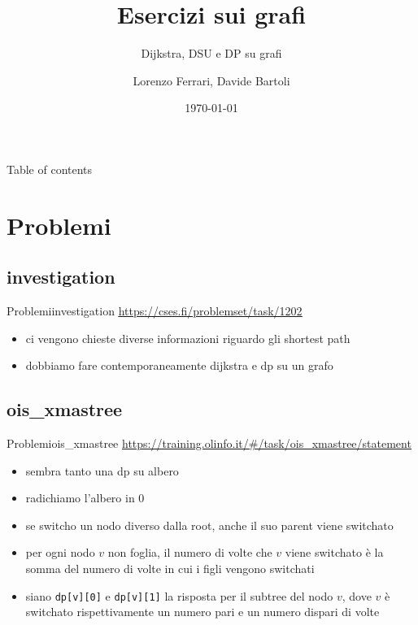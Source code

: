 \documentclass[compress]{beamer}
\title{Esercizi sui grafi}
\subtitle{Dijkstra, DSU e DP su grafi}
\author{Lorenzo Ferrari, Davide Bartoli}
\date{\today}
\begin{document}
\begin{frame}
  \maketitle
\end{frame}

\begin{frame}{Table of contents}
  \tableofcontents
\end{frame}

\section{Problemi}

\subsection{investigation}
\begin{frame}{Problemi}{investigation}
    \underline{\url{https://cses.fi/problemset/task/1202}}
    \begin{itemize}
        \item ci vengono chieste diverse informazioni riguardo gli shortest path
        \pause
    \item dobbiamo fare contemporaneamente dijkstra e dp su un grafo
    \end{itemize}
\end{frame}

\subsection{ois\_xmastree}
\begin{frame}{Problemi}{ois\_xmastree}
    \underline{\url{https://training.olinfo.it/\#/task/ois_xmastree/statement}}
    \begin{itemize}
        \item sembra tanto una dp su albero
        \pause
        \item radichiamo l'albero in $0$
        \pause
        \item se switcho un nodo diverso dalla root, anche il suo parent viene switchato
        \item per ogni nodo  $v$ non foglia, il numero di volte che $v$ viene switchato \`e la somma del numero di volte in cui i figli vengono switchati
        \pause
        \item siano \texttt{dp[v][0]} e \texttt{dp[v][1]} la risposta per il subtree del nodo $v$, dove $v$ \`e switchato rispettivamente un numero pari e un numero dispari di volte
    \end{itemize}
\end{frame}
\end{document}
